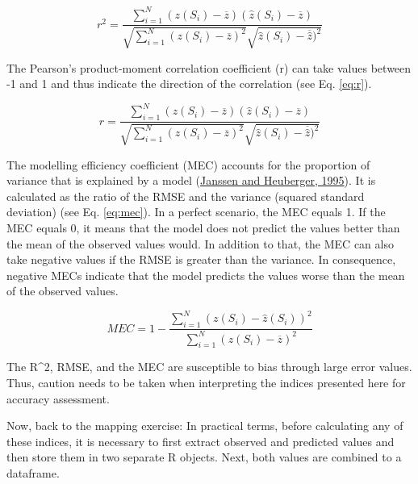 \documentclass[
  10pt,
  b5paper,
  oneside]{book}
\begin{document}
\begin{equation} 
  r^2 = \frac{\sum_{i=1}^{N}(z(S_{i})-\overline{z})(\hat{z}(S_{i})-\overline{z})}{\sqrt{\sum_{i=1}^{N}(z(S_{i})-\overline{z})^2}\sqrt{\hat{z}(S_{i})-\overline{\hat{z}})^2}}
  \label{eq:r2}
\end{equation}

The Pearson's product-moment correlation coefficient (r) can take values between -1 and 1 and thus indicate the direction of the correlation (see Eq. \eqref{eq:r}).

\begin{equation} 
  r = \frac{\sum_{i=1}^{N}(z(S_{i})-\overline{z})(\hat{z}(S_{i})-\overline{z})}{\sqrt{\sum_{i=1}^{N}(z(S_{i})-\overline{z})^2}\sqrt{\hat{z}(S_{i})-\overline{\hat{z}})^2}}
  \label{eq:r}
\end{equation}

The modelling efficiency coefficient (MEC) accounts for the proportion of variance that is explained by a model (\protect\hyperlink{ref-Janssen1995}{Janssen and Heuberger, 1995}). It is calculated as the ratio of the RMSE and the variance (squared standard deviation) (see Eq. \eqref{eq:mec}). In a perfect scenario, the MEC equals 1. If the MEC equals 0, it means that the model does not predict the values better than the mean of the observed values would. In addition to that, the MEC can also take negative values if the RMSE is greater than the variance. In consequence, negative MECs indicate that the model predicts the values worse than the mean of the observed values.

\begin{equation} 
  MEC = 1 - \frac{\sum_{i=1}^{N}(z(S_{i})-\hat{z}(S_{i}))^2}{\sum_{i=1}^{N}(z(S_{i})-\overline{z})^2}
  \label{eq:mec}
\end{equation}

The R\^{}2, RMSE, and the MEC are susceptible to bias through large error values. Thus, caution needs to be taken when interpreting the indices presented here for accuracy assessment.

Now, back to the mapping exercise: In practical terms, before calculating any of these indices, it is necessary to first extract observed and predicted values and then store them in two separate R objects. Next, both values are combined to a dataframe.
\end{document}
